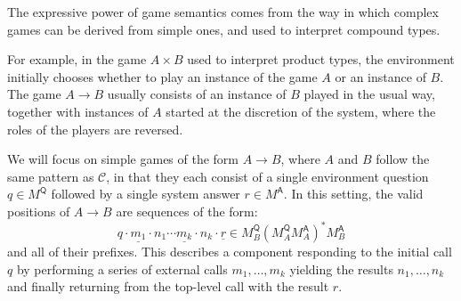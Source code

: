 \documentclass[sigplan,10pt,review,anonymous]{acmart}\settopmatter{printfolios=true,printccs=false,printacmref=false}
\newcommand{\kw}[1]{\ensuremath{ \mathsf{#1} }}
\begin{document}
The expressive power of game semantics
comes from the way in which complex games can be derived from simple ones,
and used to interpret compound types.

For example,
in the game $A \times B$ used to interpret product types,
the environment initially chooses whether to play
an instance of the game $A$ or an instance of $B$.
The game $A \rightarrow B$ usually consists of
an instance of $B$ played in the usual way,
together with instances of $A$
started at the discretion of the system,
where the roles of the players are reversed.

We will focus on simple games of the form $A \rightarrow B$,
where $A$ and $B$ follow the same pattern as $\mathcal{C}$,
in that they each consist of a single environment question
$q \in M^\kw{Q}$
followed by a single system answer
$r \in M^\kw{A}$.
In this setting,
the valid positions of $A \rightarrow B$ are
sequences of the form:
\[
  q \cdot \underline{m_1} \cdot n_1 \cdots
          \underline{m_k} \cdot n_k \cdot \underline{r} \in
  M_B^\kw{Q} ( {M_A^\kw{Q}} M_A^\kw{A} )^* {M_B^\kw{A}}
\]
and all of their prefixes.
This describes a component responding to
the initial call $q$ by
performing a series of external calls $m_1, \ldots, m_k$
yielding the results $n_1, \ldots, n_k$
and finally returning from the top-level call
with the result $r$.


\end{document}
